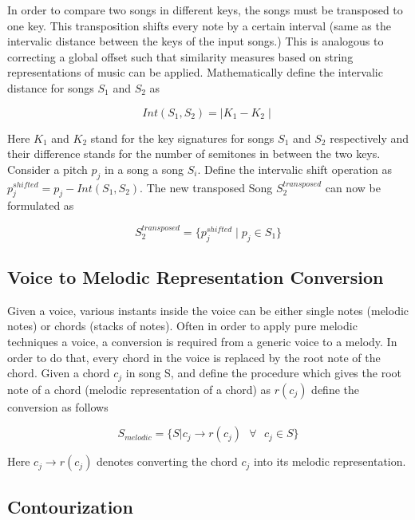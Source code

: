 \noindent In order to compare two songs in different keys, the songs must be transposed to one key. This transposition shifts every note by a certain interval (same as the intervalic distance between the keys of the input songs.) This is analogous to correcting a global offset such that similarity measures based on string representations of music can be applied. Mathematically define the intervalic distance for songs $S_1$ and $S_2$ as 

\begin{equation}
Int(S_1, S_2) = \mid K_1 - K_2 \mid
\end{equation}

\noindent Here $K_1$ and $K_2$ stand for the key signatures for songs $S_1$ and $S_2$ respectively and their difference stands for the number of semitones in between the two keys. Consider a pitch $p_j$ in a song a song $S_i$. Define the intervalic shift operation as $p^{shifted}_j = p_j - Int(S_1, S_2)$. The new transposed Song $S^{transposed}_2$ can now be formulated as 

\begin{equation}
S^{transposed}_2 = \{p^{shifted}_j \mid p_j \in S_1 \}
\end{equation}

\subsection{Voice to Melodic Representation Conversion} \label{voicemelconv} 

\noindent Given a voice, various instants inside the voice can be either single notes (melodic notes) or chords (stacks of notes). Often in order to apply pure melodic techniques a voice, a conversion is required from a generic voice to a melody. In order to do that, every chord in the voice is replaced by the root note of the chord. Given a chord $c_j$ in song S, and define the procedure which gives the root note of a chord (melodic representation of a chord) as $r(c_j)$ define the conversion as follows 

\begin{equation}
S_{melodic} = \{S | c_j \rightarrow r(c_j) \ \ \ \forall \ \ \ c_j \in S\}
\end{equation}

\noindent Here $c_j \rightarrow r(c_j)$ denotes converting the chord $c_j$ into its melodic representation. 
 
\subsection{Contourization} \label{contourization}

